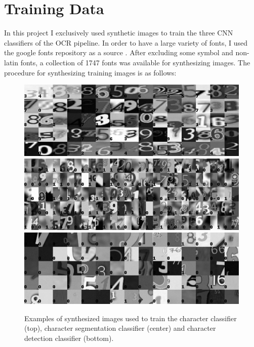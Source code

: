 \documentclass[12pt]{article}
\begin{document}
\newpage
\section{Training Data}
In this project I exclusively used synthetic images to train the three CNN classifiers
of the OCR pipeline. In order to have a large variety of fonts,
I used the google fonts repository as a source \cite{googlefo53:online}. After excluding some
symbol and non-latin fonts, a collection of 1747 fonts was available for synthesizing images.
The procedure for synthesizing training images is as follows:

\begin{figure}[b!]
  \centering
  \includegraphics[width=1.0\linewidth]{fig/training_example_images/classifier}
  \includegraphics[width=1.0\linewidth]{fig/training_example_images/segmentation}
  \includegraphics[width=1.0\linewidth]{fig/training_example_images/detection}
  \caption
  {
    Examples of synthesized images used to train the character classifier (top),
    character segmentation classifier (center) and character detection classifier (bottom).
  }
  \label{fig:training_images}
\end{figure}
\end{document}
